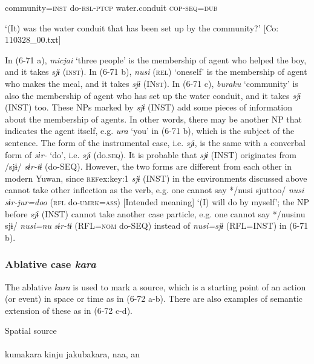       community=\textsc{inst}  do-\textsc{rsl}-\textsc{ptcp}  water.conduit  \textsc{cop}-\textsc{seq}=\textsc{dub}

\glt ‘(It) was the water conduit that has been set up by the community?’ [Co: 110328\_00.txt]
\z

In (6-71 a), \textit{micjai} ‘three people’ is the membership of agent who helped the boy, and it takes \textit{sjɨ} (\textsc{inst}). In (6-71 b), \textit{nusi} (\textsc{rel}) ‘oneself’ is the membership of agent who makes the meal, and it takes \textit{sjɨ} (IN\textsc{st}). In (6-71 c), \textit{buraku} ‘community’ is also the membership of agent who has set up the water conduit, and it takes \textit{sjɨ} (INST) too. These NPs marked by \textit{sjɨ} (INST) add some pieces of information about the membership of agents. In other words, there may be another NP that indicates the agent itself, e.g. \textit{ura} ‘you’ in (6-71 b), which is the subject of the sentence. The form of the instrumental case, i.e. \textit{sjɨ}, is the same with a converbal form of \textit{sɨr-} ‘do’, i.e. \textit{sjɨ} (do.\textsc{seq}). It is probable that \textit{sjɨ} (INST) originates from /sjɨ/ \textit{sɨr-tɨ} (do-SEQ). However, the two forms are different from each other in modern Yuwan, since \textsc{ref}{ex:key:1} \textit{sjɨ} (INST) in the environments discussed above cannot take other inflection as the verb, e.g. one cannot say */nusi sjuttoo/ \textit{nusi} \textit{sɨr-jur=doo} (\textsc{rfl} do-\textsc{umrk}=\textsc{ass}) [Intended meaning] ‘(I) will do by myself’;  the NP before \textit{sjɨ} (INST) cannot take another case particle, e.g. one cannot say */nusinu sjɨ/ \textit{nusi=nu} \textit{sɨr-tɨ} (RFL=\textsc{nom} do-SEQ) instead of \textit{nusi=sjɨ} (RFL=INST) in (6-71 b).

\subsubsection{ Ablative case \textit{kara}}

The ablative \textit{kara} is used to mark a source, which is a starting point of an action (or event) in space or time as in (6-72 a-b). There are also examples of semantic extension of these as in (6-72 c-d).

\ea\label{ex:6-72}
 Spatial source\\

 \ea{}\\
\gll  {\TM}  kumakara  kinju  jakubakara,  naa,  an\\

